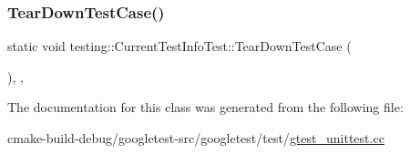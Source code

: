 \mbox{\label{classtesting_1_1CurrentTestInfoTest_a9a80a5a3e6e70c619870c2ae9df892a6}} 
\subsubsection{\texorpdfstring{TearDownTestCase()}{TearDownTestCase()}}
{\footnotesize\ttfamily static void testing\+::\+Current\+Test\+Info\+Test\+::\+Tear\+Down\+Test\+Case (\begin{DoxyParamCaption}{ }\end{DoxyParamCaption})\hspace{0.3cm}{\ttfamily [inline]}, {\ttfamily [static]}, {\ttfamily [protected]}}



The documentation for this class was generated from the following file\+:\begin{DoxyCompactItemize}
\item 
cmake-\/build-\/debug/googletest-\/src/googletest/test/\mbox{\hyperlink{gtest__unittest_8cc}{gtest\+\_\+unittest.\+cc}}\end{DoxyCompactItemize}
